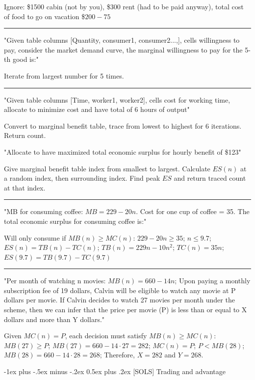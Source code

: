 \documentclass[a4paper]{article}
\makeatletter
\renewcommand{\section}{\@startsection{section}{1}{0mm}%
                                {-1ex plus -.5ex minus -.2ex}%
                                {0.5ex plus .2ex}%
                                {\normalfont\small\bfseries}}
\makeatother
\begin{document}
\begin{multicols*}{3}
    Ignore: \$1500 cabin (not by you), \$300 rent (had to be paid anyway), total cost of food to go on vacation \$$200-75$

    \rule{1\linewidth}{0.4pt}

    "Given table columns [Quantity, consumer1, consumer2...,], cells willingness to pay, consider the market demand curve, the marginal willingness to pay for the 5-th good is:"

    Iterate from largest number for 5 times.

    \rule{1\linewidth}{0.4pt}

    "Given table columns [Time, worker1, worker2], cells cost for working time, allocate to minimize cost and have total of 6 hours of output"

    Convert to marginal benefit table, trace from lowest to highest for 6 iterations. Return count.

    "Allocate to have maximized total economic surplus for hourly benefit of \$123"

    Give marginal benefit table index from smallest to largest. Calculate $ES(n)$ at a random index, then surrounding index. Find peak $ES$ and return traced count at that index.

    \rule{1\linewidth}{0.4pt}

    "MB for consuming coffee: $MB=229-20n$. Cost for one cup of coffee = 35. The total economic surplus for consuming coffee is:"

    Will only consume if $MB(n) \geq MC(n)$: $229-20n \geq 35$; $n \leq 9.7$; $ES(n) = TB(n) - TC(n)$; $TB(n) = 229n - 10n^2$; $TC(n) = 35n$; $ES(9.7) = TB(9.7) - TC(9.7)$

    \rule{1\linewidth}{0.4pt}

    "Per month of watching n movies: $MB(n)=660-14n$; Upon paying a monthly subscription fee of 19 dollars, Calvin will be eligible to watch any movie at P dollars per movie. If Calvin decides to watch 27 movies per month under the scheme, then we can infer that the price per movie (P) is less than or equal to X dollars and more than Y dollars."

    Given $MC(n) = P$, each decision must satisfy $MB(n) \geq MC(n)$: $MB(27) \geq P$; $MB(27) = 660 - 14 \cdot 27 = 282$; $MC(n) = P$; $P < MB(28)$; $MB(28) = 660 - 14 \cdot 28 = 268$; Therefore, $X = 282$ and $Y = 268$.

    \section{[SOLS] Trading and advantage}


\end{multicols*}
\end{document}
